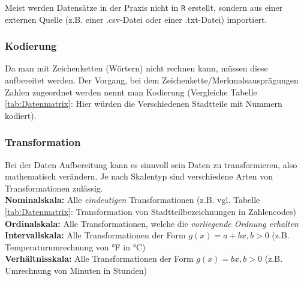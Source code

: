 \documentclass[a4paper]{article}
\newcommand\dangersign[1][2ex]{%
  \renewcommand\stacktype{L}%
  \scaleto{\stackon[1.3pt]{\color{red}$\triangle$}{\tiny !}}{#1}%
}
\begin{document}
\noindent {}

\noindent \dangersign[3ex] Meist werden Datensätze in der Praxis nicht in \texttt{R} erstellt, sondern aus einer externen Quelle (z.B. einer .csv-Datei oder einer .txt-Datei) importiert. 

\noindent {}

\subsubsection{Kodierung}
Da man mit Zeichenketten (Wörtern) nicht rechnen kann, müssen diese aufbereitet werden.
Der Vorgang, bei dem Zeichenkette/Merkmalsausprägungen Zahlen zugeordnet werden nennt man Kodierung (Vergleiche Tabelle \ref{tab:Datenmatrix}: Hier würden die Verschiedenen Stadtteile mit Nummern kodiert).


\subsubsection{Transformation}
Bei der Daten Aufbereitung kann es sinnvoll sein Daten zu transformieren, also mathematisch verändern.
Je nach Skalentyp sind verschiedene Arten von Transformationen zulässig.\\
\textbf{Nominalskala:} Alle \textit{eindeutigen} Transformationen (z.B. vgl. Tabelle \ref{tab:Datenmatrix}: Transformation von Stadtteilbezeichnungen in Zahlencodes)\\
\textbf{Ordinalskala:} Alle Transformationen, welche die \textit{vorliegende Ordnung erhalten}\\
\textbf{Intervallskala:} Alle Transformationen der Form $g(x)=a+bx,  b>0$ (z.B. Temperaturumrechnung von °F in °C)\\
\textbf{Verhältnisskala:} Alle Transformationen der Form $g(x)=bx, b>0$ (z.B. Umrechnung von Minuten in Stunden)
\\
\end{document}

